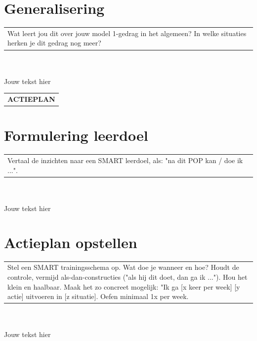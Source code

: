\documentclass[12pt, a4paper, dutch]{article}
\begin{document}
\section{\small Generalisering} \label{section:Generalisering}
\begin{tabular}{p{}}
    \cellcolor{lightgray!30}\tiny Wat leert jou dit over jouw model 1-gedrag in het algemeen? In welke situaties herken je dit gedrag nog meer?
\end{tabular}\\\\
Jouw tekst hier
\pagebreak
























\begin{tabular}{p{}}\\
    \cellcolor{lightgray!65}\centering \large \vspace{-5pt} \textbf{ACTIEPLAN}
\end{tabular}

\section{\small Formulering leerdoel} \label{Formulering leerdoel}
\begin{tabular}{p{}}
    \cellcolor{lightgray!30}\tiny Vertaal de inzichten naar een SMART leerdoel, als: "na dit POP kan / doe ik ...".
\end{tabular}\\\\
Jouw tekst hier

\section{\small Actieplan opstellen} \label{section:Actieplan_Opstellen}
\begin{tabular}{p{}}
    \cellcolor{lightgray!30}\tiny Stel een SMART trainingsschema op. Wat doe je wanneer en hoe? Houdt de controle, vermijd als-dan-constructies ("als hij dit doet, dan ga ik ..."). Hou het klein en haalbaar. Maak het zo concreet mogelijk: "Ik ga [x keer per week] [y actie] uitvoeren in [z situatie]. Oefen minimaal 1x per week.
\end{tabular}\\\\
Jouw tekst hier
\end{document}
